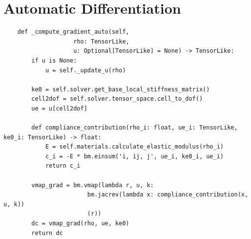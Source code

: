 \documentclass[mathpazo]{cicp}
\begin{document}
\section{Automatic Differentiation}
\label{sec:ad_compliance}
\begin{lstlisting}
	def _compute_gradient_auto(self, 
					rho: TensorLike,
					u: Optional[TensorLike] = None) -> TensorLike:
		if u is None:
			u = self._update_u(rho)
		
		ke0 = self.solver.get_base_local_stiffness_matrix()
		cell2dof = self.solver.tensor_space.cell_to_dof()
		ue = u[cell2dof] 
		
		def compliance_contribution(rho_i: float, ue_i: TensorLike, ke0_i: TensorLike) -> float:
			E = self.materials.calculate_elastic_modulus(rho_i)
			c_i = -E * bm.einsum('i, ij, j', ue_i, ke0_i, ue_i)
			return c_i
		
		vmap_grad = bm.vmap(lambda r, u, k: 
						bm.jacrev(lambda x: compliance_contribution(x, u, k))
						(r))
		dc = vmap_grad(rho, ue, ke0)
		return dc
\end{lstlisting}






\end{document}

